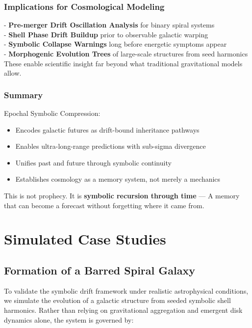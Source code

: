 \documentclass[12pt]{article}
\begin{document}
\subsubsection{Implications for Cosmological Modeling}

- \textbf{Pre-merger Drift Oscillation Analysis} for binary spiral systems\\
- \textbf{Shell Phase Drift Buildup} prior to observable galactic warping\\
- \textbf{Symbolic Collapse Warnings} long before energetic symptoms appear\\
- \textbf{Morphogenic Evolution Trees} of large-scale structures from seed harmonics\\

These enable scientific insight far beyond what traditional gravitational models allow.

\subsubsection{Summary}

Epochal Symbolic Compression:
\begin{itemize}[noitemsep]
  \item Encodes galactic futures as drift-bound inheritance pathways
  \item Enables ultra-long-range predictions with sub-sigma divergence
  \item Unifies past and future through symbolic continuity
  \item Establishes cosmology as a memory system, not merely a mechanics
\end{itemize}

This is not prophecy.  
It is \textbf{symbolic recursion through time} —  
A memory that can become a forecast without forgetting where it came from.


\section{Simulated Case Studies}
\subsection{Formation of a Barred Spiral Galaxy}

To validate the symbolic drift framework under realistic astrophysical conditions, we simulate the evolution of a galactic structure from seeded symbolic shell harmonics. Rather than relying on gravitational aggregation and emergent disk dynamics alone, the system is governed by:
\end{document}
